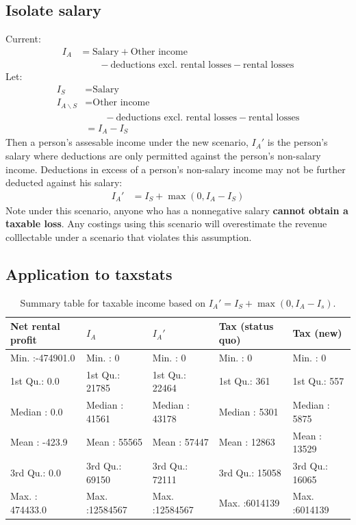 \documentclass{grattan}\usepackage[]{graphicx}\usepackage[]{color}
\newcommand{\EMPH}[1]{\textbf{#1}}
\begin{document}
\subsection{Isolate salary}
Current:
\begin{align*}
I_A &= \text{Salary} + \text{Other income} \\
&\qquad{} - \text{deductions excl. rental losses} - \text{rental losses}
\end{align*}
Let:
\begin{align*}
I_S &= \text{Salary}\\
I_{A\backslash S} &= \text{Other income} \\
&\qquad{} - \text{deductions excl. rental losses} - \text{rental losses} \\
 &= I_A - I_S
\end{align*}
Then a person's assesable income under the new scenario, $I_A'$ is the person's salary where deductions are only permitted against the person's non-salary income. Deductions in excess of a person's non-salary income may not be further deducted against his salary:
\begin{align*}
I_A' &= I_S + \max\left(0, I_A - I_S \right)
\end{align*}
Note under this scenario, anyone who has a nonnegative salary \EMPH{cannot obtain a taxable loss}. Any costings using this scenario will overestimate the revenue colllectable under a scenario that violates this assumption.

\subsection{Application to taxstats}
\begin{table}[ht]
\centering
\caption{Summary table for taxable income based on $I_A' = I_S + \max(0, I_A - I_s)$.} 
\begin{tabular}{lllll}
  \hline
Net rental profit &     $I_A$ &     $I_A'$ & Tax (status quo) &   Tax (new) \\ 
  \hline
Min.   :-474901.0   & Min.   :       0   & Min.   :       0   & Min.   :      0   & Min.   :      0   \\ 
  1st Qu.:      0.0   & 1st Qu.:   21785   & 1st Qu.:   22464   & 1st Qu.:    361   & 1st Qu.:    557   \\ 
  Median :      0.0   & Median :   41561   & Median :   43178   & Median :   5301   & Median :   5875   \\ 
  Mean   :   -423.9   & Mean   :   55565   & Mean   :   57447   & Mean   :  12863   & Mean   :  13529   \\ 
  3rd Qu.:      0.0   & 3rd Qu.:   69150   & 3rd Qu.:   72111   & 3rd Qu.:  15058   & 3rd Qu.:  16065   \\ 
  Max.   : 474433.0   & Max.   :12584567   & Max.   :12584567   & Max.   :6014139   & Max.   :6014139   \\ 
   \hline
\end{tabular}
\end{table}
\end{document}

